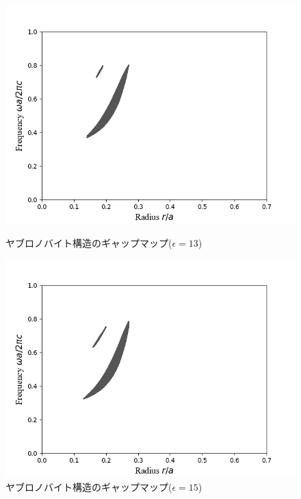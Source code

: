 \documentclass[platex,dvipdfmx]{jsreport}
\numberwithin{equation}{section}
\begin{document}
\begin{figure}[h]
  \begin{minipage}[h]{0.5\linewidth}
    \centering
    \includegraphics[keepaspectratio, scale=0.45]{results/gap_map/yablonovite_e-13.png}
    \caption{ヤブロノバイト構造のギャップマップ($\epsilon = 13$)}
    \label{fig:gapmap_yablonovite_e-13}
  \end{minipage}
  \begin{minipage}[h]{0.5\linewidth}
    \centering
    \includegraphics[keepaspectratio, scale=0.45]{results/gap_map/yablonovite_e-15.png}
    \caption{ヤブロノバイト構造のギャップマップ($\epsilon = 15$)}
    \label{fig:gapmap_yablonovite_e-15}
  \end{minipage}
\end{figure}
\end{document}
